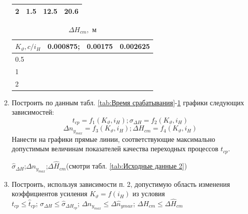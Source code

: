 \documentclass[a4paper,12pt]{article}
\begin{document}
\begin{enumerate}
\begin{table}[H]
\begin{tabular}{|l|l|l|l|}
            2 & 1.5 & 12.5 & 20.6  \\ \hline
        \end{tabular}
    \end{table}
    \begin{table}[H]
        \centering
        \caption{$\Delta H_{cm},$ м}
        \label{tab: Статистическая ошибка}
        \begin{tabular}{|l|l|l|l|}
        \hline
            $K_\vartheta,c/i_H$ & 0.000875; & 0.00175 & 0.002625  \\ \hline
            0.5 &   &   &   \\ \hline
            1 &   &   &   \\ \hline
            2 &   &   &   \\ \hline
        \end{tabular}
    \end{table}

    \item Построить по данным табл. \ref{tab:Время срабатывания}-\ref{tab: Статистическая ошибка} графики следующих зависимостей:
    $$t_{cp}=f_1(K_{\vartheta},i_H);\sigma_{\Delta H}=f_2(K_{\vartheta},i_H)$$
    $$\Delta n_{y_{max}}=f_3(K_{\vartheta},i_H);\Delta H_{cm}=f_4(K_{\vartheta},i_H)$$
    Нанести   на   графики   прямые   линии,   соответствующие   максимально допустимым величинам показателей качества переходных процессов  $t_{cp}$. 

    $\hat{\sigma}_{\Delta H}$;$\Delta n_{y_{max}}$;$\Delta \hat{H}_{cm}$(смотри табл. \ref{tab:Исходные данные 2})

    \item Построить, используя зависимости п. 2, допустимую область изменения коэффициентов усиления $K_{\vartheta}=f(i_H)$ из условия \\ $t_{cp} \leq \hat{t}_{cp}$; $\sigma_{\Delta H} \leq \hat{\sigma}_{\Delta H_{cp}}$;
    $\Delta n_{y_{max}} \leq \Delta \hat{n}_{y{max}}$; $\Delta H_{cm} \leq \Delta \hat{H}_{cm}$  

    \end{enumerate}
\end{document}
